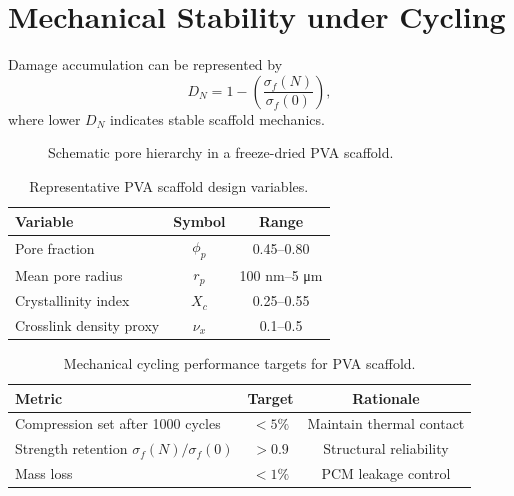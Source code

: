 \section{Mechanical Stability under Cycling}
Damage accumulation can be represented by
\begin{equation}\label{eq:damage}
D_N=1-\left(\frac{\sigma_f(N)}{\sigma_f(0)}\right),
\end{equation}
where lower $D_N$ indicates stable scaffold mechanics.

\begin{figure}[htbp]
\centering
{}
\caption{Schematic pore hierarchy in a freeze-dried PVA scaffold.}
\label{fig:pva_hierarchy}
\end{figure}

\begin{table}[htbp]
\centering
\caption{Representative PVA scaffold design variables.}
\label{tab:pva_design}
\begin{tabular}{lcc}
\toprule
Variable & Symbol & Range \\
\midrule
Pore fraction & $\phi_p$ & 0.45--0.80 \\
Mean pore radius & $r_p$ & 100 nm--5 \si{\micro\meter} \\
Crystallinity index & $X_c$ & 0.25--0.55 \\
Crosslink density proxy & $\nu_x$ & 0.1--0.5 \\
\bottomrule
\end{tabular}
\end{table}

\begin{table}[htbp]
\centering
\caption{Mechanical cycling performance targets for PVA scaffold.}
\label{tab:pva_mech_targets}
\begin{tabular}{lcc}
\toprule
Metric & Target & Rationale \\
\midrule
Compression set after 1000 cycles & $<5\%$ & Maintain thermal contact \\
Strength retention $\sigma_f(N)/\sigma_f(0)$ & $>0.9$ & Structural reliability \\
Mass loss & $<1\%$ & PCM leakage control \\
\bottomrule
\end{tabular}
\end{table}
